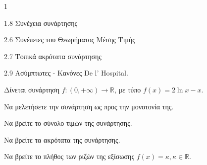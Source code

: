 \begin{ylh}{1}
    \item 1.8 Συνέχεια συνάρτησης
    \item 2.6 Συνέπειες του Θεωρήματος Μέσης Τιμής
    \item 2.7 Τοπικά ακρότατα συνάρτησης
    \item 2.9 Ασύμπτωτες - Κανόνες De l’ Hospital.
\end{ylh}
Δίνεται συνάρτηση $f: (0, +\infty) \to \mathbb{R}$, με τύπο $f(x) = 2 \ln x - x$.
\begin{alist}
\item
    \begin{rlist}
    \item Να μελετήσετε την συνάρτηση ως προς την μονοτονία της. 
    \item Να βρείτε το σύνολο τιμών της συνάρτησης. 
    \item Να βρείτε τα ακρότατα της συνάρτησης. 
    \end{rlist}
\item Να βρείτε το πλήθος των ριζών της εξίσωσης $f(x) = \kappa, \kappa \in \mathbb{R}$. 
\end{alist}